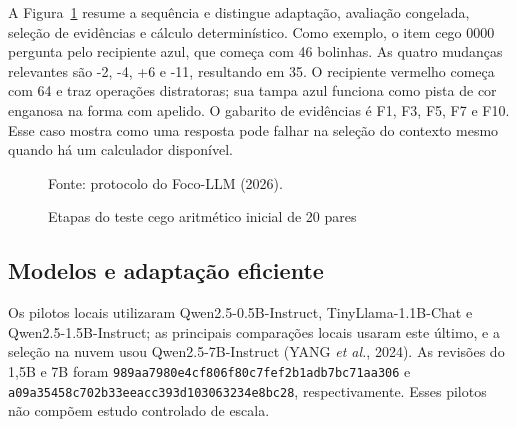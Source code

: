 \documentclass[12pt,a4paper]{article}
\begin{document}
A Figura~\ref{fig:workflow} resume a sequência e distingue adaptação, avaliação congelada, seleção de evidências e cálculo determinístico. Como exemplo, o item cego 0000 pergunta pelo recipiente azul, que começa com 46 bolinhas. As quatro mudanças relevantes são -2, -4, +6 e -11, resultando em 35. O recipiente vermelho começa com 64 e traz operações distratoras; sua tampa azul funciona como pista de cor enganosa na forma com apelido. O gabarito de evidências é F1, F3, F5, F7 e F10. Esse caso mostra como uma resposta pode falhar na seleção do contexto mesmo quando há um calculador disponível.

\begin{figure}[htbp]\centering\caption{Etapas do teste cego aritmético inicial de 20 pares}\label{fig:workflow}\par{\fontsize{10}{12}\selectfont Fonte: protocolo do Foco-LLM (2026).\par}\end{figure}

\subsection{Modelos e adaptação eficiente}
Os pilotos locais utilizaram Qwen2.5-0.5B-Instruct, TinyLlama-1.1B-Chat e Qwen2.5-1.5B-Instruct; as principais comparações locais usaram este último, e a seleção na nuvem usou Qwen2.5-7B-Instruct (YANG \textit{et al.}, 2024). As revisões do 1,5B e 7B foram \nolinkurl{989aa7980e4cf806f80c7fef2b1adb7bc71aa306} e \nolinkurl{a09a35458c702b33eeacc393d103063234e8bc28}, respectivamente. Esses pilotos não compõem estudo controlado de escala.
\end{document}
